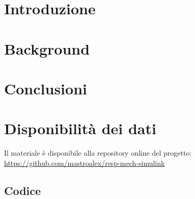 \section{Introduzione}

\textcolor{blue}{
	\lipsum[1-2]
}

\section{Background}



\section{Conclusioni}


\section*{Disponibilità dei dati}

Il materiale è disponibile alla repository online del progetto: \url{https://github.com/mastroalex/resp-mech-simulink}

\subsection*{Codice}

\raggedbottom

\pagebreak
\printbibliography[title=Riferimenti]



